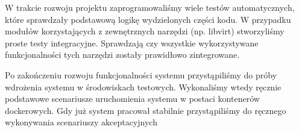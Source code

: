 \documentclass[../analiza-rozwiazania.tex]{subfiles}
\begin{document}
W trakcie rozwoju projektu zaprogramowaliśmy wiele testów automatycznych, które sprawdzały podstawową logikę wydzielonych części kodu.
W przypadku modułów korzystających z zewnętrznych narzędzi (np. libvirt) stworzyliśmy proste testy integracyjne.
Sprawdzają czy wszystkie wykorzystywane funkcjonalności tych narzędzi zostały prawidłowo zintegrowane.

Po zakończeniu rozwoju funkcjonalności systemu przystąpiliśmy do próby wdrożenia systemu w środowiskach testowych.
Wykonaliśmy wtedy ręcznie podstawowe scenariusze uruchomienia systemu w postaci kontenerów dockerowych.
Gdy już system pracował stabilnie przystąpiliśmy do ręcznego wykonywania scenariuszy akceptacyjnych
\end{document}
